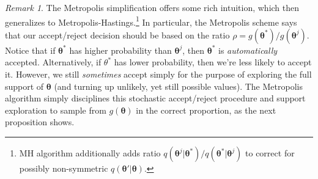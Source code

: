 \documentclass[12pt]{article}
\theoremstyle{plain}
\theoremstyle{definition}
\theoremstyle{remark}
\newtheorem*{rmk}{Remark}
\newcommand{\bstheta}{\boldsymbol{\theta}}
\begin{document}
\begin{rmk}
The Metropolis simplification offers some rich intuition, which then
generalizes to Metropolis-Hastings.\footnote{%
  MH algorithm additionally adds ratio
  $q(\bstheta^j|\bstheta^*)/q(\bstheta^*|\bstheta^j)$ to correct for
  possibly non-symmetric $q(\bstheta'|\bstheta)$.
}
In particular, the Metropolis scheme says that our accept/reject
decision should be based on the ratio
$\rho=g(\bstheta^*)/g(\bstheta^j)$.
Notice that if $\bstheta^*$ has higher probability than
$\bstheta^j$, then $\bstheta^*$ is \emph{automatically} accepted.
Alternatively, if $\theta^*$ has lower probability,
then we're less likely to accept it. However, we still \emph{sometimes}
accept simply for the purpose of exploring the full support of
$\bstheta$ (and turning up unlikely, yet still possible values).
The Metropolis algorithm simply disciplines this stochastic
accept/reject procedure and support exploration to sample from
$g(\bstheta)$ in the correct proportion, as the next proposition shows.
\end{rmk}
\end{document}
